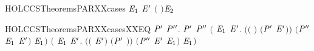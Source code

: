 \begin{SaveVerbatim}{HOLCCSTheoremsPARXXcases}
            \HOLTokenTransBegin{} \HOLTokenTransEnd \ensuremath{\HOLBoundVar{E}\sb{\mathrm{1}}} \HOLSymConst{\HOLTokenConj{}} \ensuremath{\HOLBoundVar{E}\sp{\prime}} \HOLTokenTransBegin{} \ensuremath{(} \ensuremath{)}\HOLTokenTransEnd \ensuremath{\HOLBoundVar{E}\sb{\mathrm{2}}}
\end{SaveVerbatim}
\newcommand{\HOLCCSTheoremsPARXXcases}{\UseVerbatim{HOLCCSTheoremsPARXXcases}}
\begin{SaveVerbatim}{HOLCCSTheoremsPARXXcasesXXEQ}
\HOLTokenTurnstile{} \HOLSymConst{\HOLTokenForall{}} \ensuremath{\HOLBoundVar{P}\sp{\prime}}  \ensuremath{\HOLBoundVar{P}\sp{\prime\prime}}.
        \HOLSymConst{\ensuremath{\mid}} \ensuremath{\HOLBoundVar{P}\sp{\prime}} \HOLTokenTransBegin{}\HOLTokenTransEnd \ensuremath{\HOLBoundVar{P}\sp{\prime\prime}} \HOLSymConst{\HOLTokenEquiv{}}
       \ensuremath{(}\HOLSymConst{\HOLTokenExists{}} \ensuremath{\HOLBoundVar{E}\sb{\mathrm{1}}} \ensuremath{\HOLBoundVar{E}\sp{\prime}}.
            \ensuremath{(}\ensuremath{(} \HOLSymConst{\ensuremath{=}} \ensuremath{)} \HOLSymConst{\HOLTokenConj{}} \ensuremath{(}\ensuremath{\HOLBoundVar{P}\sp{\prime}} \HOLSymConst{\ensuremath{=}} \ensuremath{\HOLBoundVar{E}\sp{\prime}}\ensuremath{)}\ensuremath{)} \HOLSymConst{\HOLTokenConj{}} \ensuremath{(}\ensuremath{\HOLBoundVar{P}\sp{\prime\prime}} \HOLSymConst{\ensuremath{=}} \ensuremath{\HOLBoundVar{E}\sb{\mathrm{1}}} \HOLSymConst{\ensuremath{\mid}} \ensuremath{\HOLBoundVar{E}\sp{\prime}}\ensuremath{)} \HOLSymConst{\HOLTokenConj{}}  \HOLTokenTransBegin{}\HOLTokenTransEnd \ensuremath{\HOLBoundVar{E}\sb{\mathrm{1}}}\ensuremath{)} \HOLSymConst{\HOLTokenDisj{}}
       \ensuremath{(}\HOLSymConst{\HOLTokenExists{}} \ensuremath{\HOLBoundVar{E}\sb{\mathrm{1}}} \ensuremath{\HOLBoundVar{E}\sp{\prime}}.
            \ensuremath{(}\ensuremath{(} \HOLSymConst{\ensuremath{=}} \ensuremath{\HOLBoundVar{E}\sp{\prime}}\ensuremath{)} \HOLSymConst{\HOLTokenConj{}} \ensuremath{(}\ensuremath{\HOLBoundVar{P}\sp{\prime}} \HOLSymConst{\ensuremath{=}} \ensuremath{)}\ensuremath{)} \HOLSymConst{\HOLTokenConj{}} \ensuremath{(}\ensuremath{\HOLBoundVar{P}\sp{\prime\prime}} \HOLSymConst{\ensuremath{=}} \ensuremath{\HOLBoundVar{E}\sp{\prime}} \HOLSymConst{\ensuremath{\mid}} \ensuremath{\HOLBoundVar{E}\sb{\mathrm{1}}}\ensuremath{)} \HOLSymConst{\HOLTokenConj{}}  \HOLTokenTransBegin{}\HOLTokenTransEnd \ensuremath{\HOLBoundVar{E}\sb{\mathrm{1}}}\ensuremath{)} \HOLSymConst{\HOLTokenDisj{}}

\end{SaveVerbatim}
